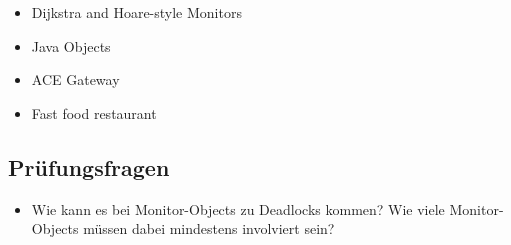 \begin{itemize}
	\item Dijkstra and Hoare-style Monitors
	\item Java Objects
	\item ACE Gateway
	\item Fast food restaurant
\end{itemize}

\subsection*{Prüfungsfragen}


\begin{itemize}
	\item Wie kann es bei Monitor-Objects zu Deadlocks kommen? Wie viele Monitor-Objects müssen dabei mindestens involviert sein?
\end{itemize}

